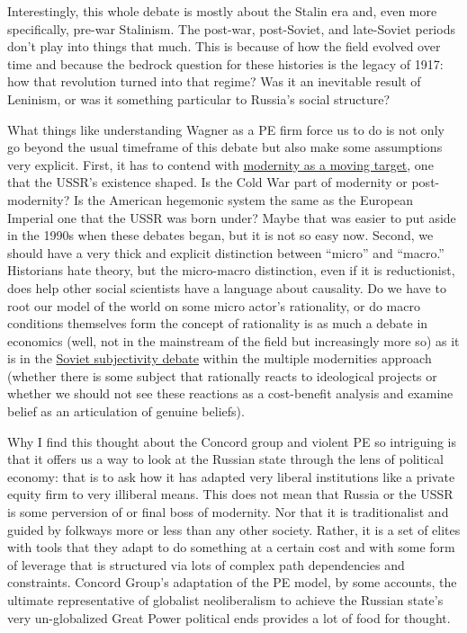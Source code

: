 \documentclass[
]{book}
\begin{document}
Interestingly, this whole debate is mostly about the Stalin era and, even more specifically, pre-war Stalinism. The post-war, post-Soviet, and late-Soviet periods don't play into things that much. This is because of how the field evolved over time and because the bedrock question for these histories is the legacy of 1917: how that revolution turned into that regime? Was it an inevitable result of Leninism, or was it something particular to Russia's social structure?

What things like understanding Wagner as a PE firm force us to do is not only go beyond the usual timeframe of this debate but also make some assumptions very explicit. First, it has to contend with \href{https://www.ghi-dc.org/fileadmin/publications/Bulletin_Supplement/Supplement_14/Sup14_105.pdf}{modernity as a moving target}, one that the USSR's existence shaped. Is the Cold War part of modernity or post-modernity? Is the American hegemonic system the same as the European Imperial one that the USSR was born under? Maybe that was easier to put aside in the 1990s when these debates began, but it is not so easy now. Second, we should have a very thick and explicit distinction between ``micro'' and ``macro.'' Historians hate theory, but the micro-macro distinction, even if it is reductionist, does help other social scientists have a language about causality. Do we have to root our model of the world on some micro actor's rationality, or do macro conditions themselves form the concept of rationality is as much a debate in economics (well, not in the mainstream of the field but increasingly more so) as it is in the \href{https://www.jstor.org/stable/41052991}{Soviet subjectivity debate} within the multiple modernities approach (whether there is some subject that rationally reacts to ideological projects or whether we should not see these reactions as a cost-benefit analysis and examine belief as an articulation of genuine beliefs).

Why I find this thought about the Concord group and violent PE so intriguing is that it offers us a way to look at the Russian state through the lens of political economy: that is to ask how it has adapted very liberal institutions like a private equity firm to very illiberal means. This does not mean that Russia or the USSR is some perversion of or final boss of modernity. Nor that it is traditionalist and guided by folkways more or less than any other society. Rather, it is a set of elites with tools that they adapt to do something at a certain cost and with some form of leverage that is structured via lots of complex path dependencies and constraints. Concord Group's adaptation of the PE model, by some accounts, the ultimate representative of globalist neoliberalism to achieve the Russian state's very un-globalized Great Power political ends provides a lot of food for thought.
\end{document}
